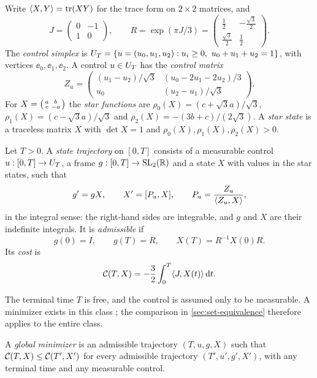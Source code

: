 Write $\langle X,Y\rangle=\operatorname{tr}(XY)$ for the trace form on $2\times2$ matrices, and
\[
  J=\begin{pmatrix}0&-1\\1&0\end{pmatrix},\qquad
  R=\exp(\pi J/3)=\begin{pmatrix}\tfrac12&-\tfrac{\sqrt3}{2}\\[2pt]\tfrac{\sqrt3}{2}&\tfrac12\end{pmatrix}.
\]
The \emph{control simplex} is $\UT=\{u=(u_0,u_1,u_2):u_i\ge0,\ u_0+u_1+u_2=1\}$, with vertices
$\ee_0,\ee_1,\ee_2$. A control $u\in U_{T}$ has the \emph{control matrix}
\[
  Z_u=\begin{pmatrix}(u_1-u_2)/\sqrt3&(u_0-2u_1-2u_2)/3\\ u_0&(u_2-u_1)/\sqrt3\end{pmatrix}.
\]
For $X=\begin{psmallmatrix}a&b\\c&-a\end{psmallmatrix}$ the \emph{star functions} are
$\rho_0(X)=(c+\sqrt3a)/\sqrt3$, $\rho_1(X)=(c-\sqrt3a)/\sqrt3$ and $\rho_2(X)=-(3b+c)/(2\sqrt3)$.
A \emph{star state} is a traceless matrix $X$ with $\det X=1$ and $\rho_0(X),\rho_1(X),\rho_2(X)>0$.

\begin{definition}\label{def:control-problem}
Let $T>0$. A \emph{state trajectory} on $[0,T]$ consists of a measurable control
$u:[0,T]\to U_{T}$, a frame $g:[0,T]\to\mathrm{SL}_2(\mathbb{R})$ and a state $X$ with values in the star states, such
that
\begin{equation}\label{eq:state}
  g'=gX,\qquad X'=[P_u,X],\qquad P_u=\frac{Z_u}{\langle Z_u,X\rangle},
\end{equation}
in the integral sense: the right-hand sides are integrable, and $g$ and $X$ are their indefinite
integrals. It is \emph{admissible} if
\[
  g(0)=I,\qquad g(T)=R,\qquad X(T)=R^{-1}X(0)R .
\]
Its \emph{cost} is
\begin{equation}\label{eq:cost}
  \mathcal{C}(T,X)=-\frac32\int_0^T\langle J,X(t)\rangle\,\mathrm{d} t .
\end{equation}
\end{definition}

The terminal time $T$ is free, and the control is assumed only to be measurable. A minimizer
exists in this class \cite[\S6.1]{HalesVajjha2024}; the comparison in \cref{sec:set-equivalence}
therefore applies to the entire class.

\begin{definition}\label{def:global-minimizer}
A \emph{global minimizer} is an admissible trajectory $(T,u,g,X)$ such that
$\mathcal{C}(T,X)\le\mathcal{C}(T',X')$ for every admissible trajectory $(T',u',g',X')$, with any terminal
time and any measurable control.
\end{definition}

